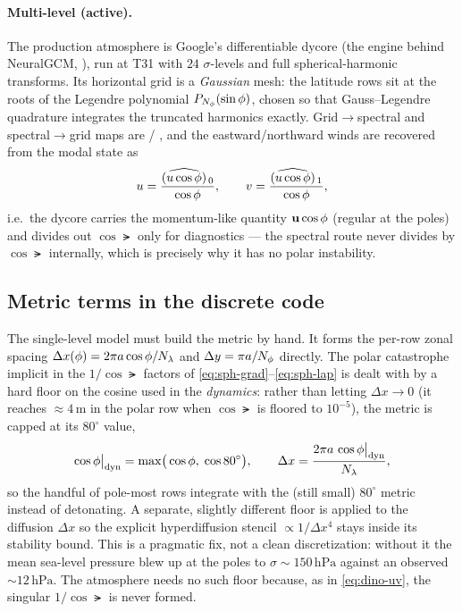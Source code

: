 \paragraph{Multi-level (active).} The production atmosphere is Google's differentiable \dino{}
dycore (the engine behind NeuralGCM, \citealp{kochkov2024neuralgcm}), run at T31 with $24$
$\sigma$-levels and full spherical-harmonic transforms. Its horizontal grid is a \emph{Gaussian}
mesh: the latitude rows sit at the roots of the Legendre polynomial $P_{N_\phi}(\sin\phi)$, chosen
so that Gauss--Legendre quadrature integrates the truncated harmonics exactly. Grid$\to$spectral
and spectral$\to$grid maps are  /
, and the eastward/northward winds are recovered from the modal state as
\begin{equation}
  u = \frac{(\widehat{u\cos\phi})_{\,0}}{\cos\phi}, \qquad
  v = \frac{(\widehat{u\cos\phi})_{\,1}}{\cos\phi},
  \label{eq:dino-uv}
\end{equation}
i.e.\ the dycore carries the momentum-like quantity $\mathbf{u}\cos\phi$ (regular at the poles) and
divides out $\cos\lat$ only for diagnostics --- the spectral route never divides by $\cos\lat$
internally, which is precisely why it has no polar instability.


\subsection{Metric terms in the discrete code}\label{sec:metric-discrete}

The single-level model must build the metric by hand. It forms the per-row zonal spacing
$\Delta x(\phi)=2\pi a\cos\phi/N_\lambda$ and $\Delta y=\pi a/N_\phi$ directly. The polar
catastrophe implicit in the $1/\cos\lat$ factors of \eqref{eq:sph-grad}--\eqref{eq:sph-lap} is
dealt with by a hard floor on the cosine used in the \emph{dynamics}: rather than letting $\Delta x\to 0$ (it reaches $\approx 4\,\mathrm{m}$ in
the polar row when $\cos\lat$ is floored to $10^{-5}$), the metric is capped at its $80^\circ$
value,
\begin{equation}
  \cos\phi\big|_{\mathrm{dyn}} = \max\!\big(\cos\phi,\;\cos 80^\circ\big),
  \qquad \Delta x = \frac{2\pi a\,\cos\phi\big|_{\mathrm{dyn}}}{N_\lambda},
  \label{eq:cos-floor}
\end{equation}
so the handful of pole-most rows integrate with the (still small) $80^\circ$ metric instead of
detonating. A separate, slightly different floor is applied to the diffusion $\Delta x$ so the
explicit hyperdiffusion stencil $\propto 1/\Delta x^4$ stays inside its stability bound. This is a
pragmatic fix, not a clean discretization: without it the mean sea-level pressure blew up at the
poles to $\sigma\sim 150\,\mathrm{hPa}$ against an observed $\sim 12\,\mathrm{hPa}$. The \dino{}
atmosphere needs no such floor because, as in \eqref{eq:dino-uv}, the singular $1/\cos\lat$ is
never formed.

